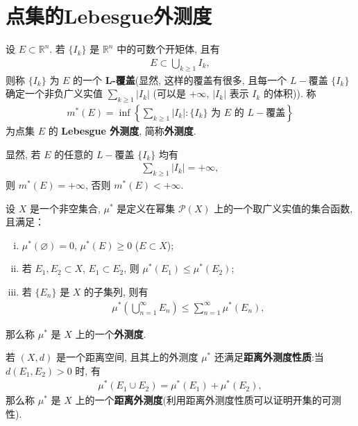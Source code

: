\documentclass[../../main.tex]{subfiles}%
\begin{document}
\section{点集的Lebesgue外测度}

\begin{definition}[Lebesgue外测度]
设 \(E \subset \mathbb{R}^n\). 若 \(\{I_k\}\) 是 \(\mathbb{R}^n\) 中的可数个开矩体, 且有
\begin{align*}
E \subset \bigcup_{k \geqslant  1} I_k,
\end{align*}
则称 \(\{I_k\}\) 为 \(E\) 的一个 \textbf{L-覆盖}(显然, 这样的覆盖有很多, 且每一个 \(L -\)覆盖 \(\{I_k\}\) 确定一个非负广义实值 \(\sum_{k \geqslant  1} |I_k|\) (可以是 \(+ \infty\), \(|I_k|\) 表示 \(I_k\) 的体积)). 称
\begin{align*}
m^*(E) = \inf \left\{ \sum_{k \geqslant  1} |I_k| : \{I_k\} \text{ 为 } E \text{ 的 } L-\text{覆盖} \right\}
\end{align*}
为点集 \(E\) 的 \textbf{Lebesgue 外测度}, 简称\textbf{外测度}.
\end{definition}
\begin{remark}
显然, 若 \(E\) 的任意的 \(L -\)覆盖 \(\{I_k\}\) 均有
\begin{align*}
\sum_{k \geqslant  1} |I_k| = + \infty,
\end{align*}
则 \(m^*(E) = + \infty\), 否则 \(m^*(E) < + \infty\). 
\end{remark}

\begin{definition}[集合上的外测度]
设 \(X\) 是一个非空集合, \(\mu^*\) 是定义在幂集 \(\mathcal{P}(X)\) 上的一个取广义实值的集合函数, 且满足：
\begin{enumerate}[(i)]
\item \(\mu^*(\varnothing)=0\), \(\mu^*(E) \geqslant  0\) (\(E \subset X\));
\item 若 \(E_1, E_2 \subset X\), \(E_1 \subset E_2\), 则 \(\mu^*(E_1) \leqslant  \mu^*(E_2)\);
\item 若 \(\{E_n\}\) 是 \(X\) 的子集列, 则有
\begin{align*}
\mu^*\left( \bigcup_{n = 1}^{\infty} E_n \right) \leqslant  \sum_{n = 1}^{\infty} \mu^*(E_n),
\end{align*}
\end{enumerate}
那么称 \(\mu^*\) 是 \(X\) 上的一个\textbf{外测度}.

若 \((X, d)\) 是一个距离空间, 且其上的外测度 \(\mu^*\) 还满足\textbf{距离外测度性质}:当 \(d(E_1, E_2)>0\) 时, 有
\begin{align*}
\mu^*(E_1 \cup E_2) = \mu^*(E_1) + \mu^*(E_2),
\end{align*}
那么称 \(\mu^*\) 是 \(X\) 上的一个\textbf{距离外测度}(利用距离外测度性质可以证明开集的可测性). 
\end{definition}
\end{document}
